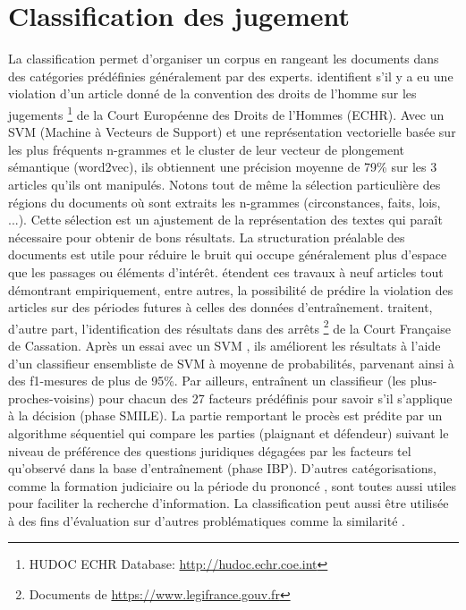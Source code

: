 \section{Classification des jugement}
La classification permet d'organiser un corpus en rangeant les documents dans des catégories prédéfinies généralement par des experts.  \cite{Aletras2016predictDecisionECHR} identifient s'il y a eu une violation d'un article donné de la convention des droits de l'homme sur les jugements \footnote{HUDOC ECHR Database: \url{http://hudoc.echr.coe.int}} de la Court Européenne des Droits de l'Hommes (ECHR). Avec un SVM (Machine à Vecteurs de Support) et une représentation vectorielle basée sur les plus fréquents n-grammes et le cluster de leur vecteur de plongement sémantique (word2vec), ils obtiennent une précision moyenne de 79\% sur les 3 articles qu'ils ont manipulés. Notons tout de même la sélection particulière des régions du documents où sont extraits les n-grammes (circonstances, faits, lois, ...). Cette sélection est un ajustement de la représentation des textes qui paraît nécessaire pour obtenir de bons résultats. La structuration préalable des documents est utile pour réduire le bruit qui occupe généralement plus d'espace que les passages ou éléments d'intérêt.  \citet{medvedeva2018echrCristalBall} étendent ces travaux à neuf articles tout démontrant empiriquement, entre autres, la possibilité de prédire la violation des articles sur des périodes futures à celles des données d'entraînement. \cite{sulea2017legalEnsSVM} traitent, d'autre part, l'identification des résultats dans des arrêts \footnote{Documents de \url{https://www.legifrance.gouv.fr}} de la Court Française de Cassation. Après un essai avec un SVM \citep{Sulea2017predictareadecision}, ils améliorent les résultats à l'aide d'un classifieur ensembliste de SVM à moyenne de probabilités, parvenant ainsi à des f1-mesures de plus de 95\%.  Par ailleurs, \cite{Ashley2009classifCases} entraînent un classifieur (les plus-proches-voisins) pour chacun des 27 facteurs prédéfinis pour savoir s'il s'applique à la décision (phase SMILE). La partie remportant le procès est prédite par un algorithme séquentiel qui compare les parties (plaignant et défendeur) suivant le niveau de préférence des questions juridiques dégagées par les facteurs tel qu'observé dans la base d'entraînement (phase IBP).  D'autres catégorisations, comme la formation judiciaire ou la période du prononcé \citep{Sulea2017predictareadecision,sulea2017legalEnsSVM}, sont toutes aussi utiles pour faciliter la recherche d'information. La classification peut aussi être utilisée à des fins d'évaluation sur d'autres problématiques comme la similarité \citep{ma2018wmdchinesecase}.

